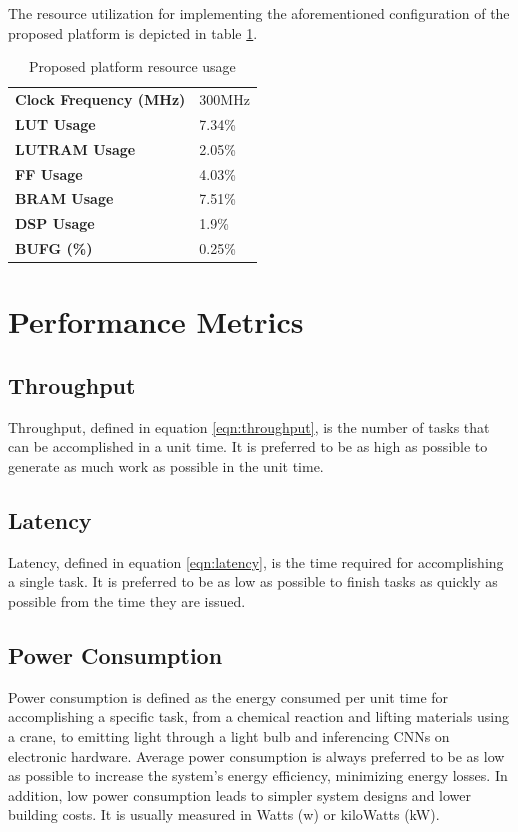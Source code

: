 The resource utilization for implementing the aforementioned configuration of the proposed platform is depicted in table \ref{tab:Proposed-platform-resource-usage}.

\begin{table}[H]
	\caption{Proposed platform resource usage}
	\label{tab:Proposed-platform-resource-usage}
	\centering
	\begin{tabular}{ll}
		\toprule
		\textbf{Clock Frequency (MHz)} & 300MHz\\
		\textbf{LUT Usage} & 7.34\%\\
		\textbf{LUTRAM Usage} & 2.05\%\\
		\textbf{FF Usage} & 4.03\%\\
		\textbf{BRAM Usage} & 7.51\%\\
		\textbf{DSP Usage} & 1.9\%\\
		\textbf{BUFG (\%)} & 0.25\%\\
		\bottomrule
	\end{tabular}
\end{table}

\section{Performance Metrics}
\subsection{Throughput}
Throughput, defined in equation \ref{eqn:throughput}, is the number of tasks that can be accomplished in a unit time. It is preferred to be as high as possible to generate as much work as possible in the unit time.

\subsection{Latency}
Latency, defined in equation \ref{eqn:latency}, is the time required for accomplishing a single task. It is preferred to be as low as possible to finish tasks as quickly as possible from the time they are issued.

\subsection{Power Consumption}
Power consumption is defined as the energy consumed per unit time for accomplishing a specific task, from a chemical reaction and lifting materials using a crane, to emitting light through a light bulb and inferencing CNNs on electronic hardware. Average power consumption is always preferred to be as low as possible to increase the system's energy efficiency, minimizing energy losses. In addition, low power consumption leads to simpler system designs and lower building costs. It is usually measured in Watts (w) or kiloWatts (kW).


